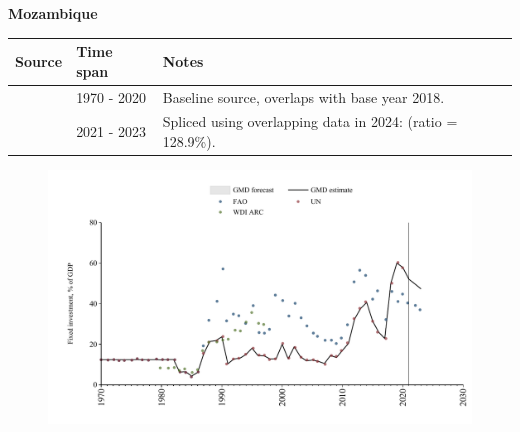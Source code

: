 \documentclass[12pt,a4paper,landscape]{article}
\begin{document}
\begin{adjustbox}{max totalsize={\paperwidth}{\paperheight},center}
\begin{minipage}[t][\textheight][t]{\textwidth}
\vspace*{0.5cm}
{}
\begin{center}
{\Large\bfseries Mozambique}
\end{center}
\vspace{0.5cm}
\begin{table}[H]
\centering
\small
\begin{tabular}{|l|l|l|}
\hline
\textbf{Source} & \textbf{Time span} & \textbf{Notes} \\
\hline
\rowcolor{white}\cite{UN}& 1970 - 2020 &Baseline source, overlaps with base year 2018.\\
\rowcolor{lightgray}\cite{FAO}& 2021 - 2023 &Spliced using overlapping data in 2024: (ratio = 128.9\%).\\
\hline
\end{tabular}
\end{table}
\begin{figure}[H]
\centering
\includegraphics[width=\textwidth,height=0.6\textheight,keepaspectratio]{graphs/MOZ_finv_GDP.pdf}
\end{figure}
\end{minipage}
\end{adjustbox}
\end{document}
